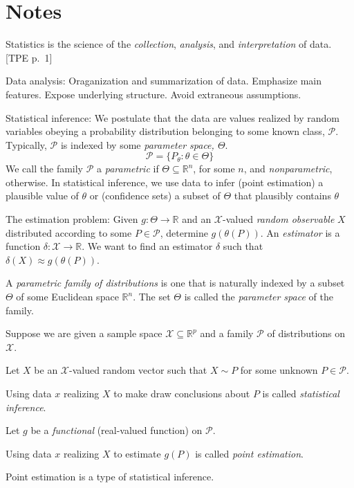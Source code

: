 \documentclass[12pt]{amsart}
\newcommand{\cP}{\mathscr{P}}
\newcommand{\cX}{\mathscr{X}}
\newcommand{\RR}{\mathbb{R}}
\begin{document}
\section{Notes}

Statistics is the science of the \emph{collection}, \emph{analysis}, and \emph{interpretation} of data. [TPE p.~1]

Data analysis: Oraganization and summarization of data.
Emphasize main features.
Expose underlying structure.
Avoid extraneous assumptions.

Statistical inference:
We postulate that the data are values realized by random variables obeying a probability distribution belonging to some known class, $\cP$.
Typically, $\cP$ is indexed by some \emph{parameter space, $\Theta$}.
\[
    \cP = \{P_\theta : \theta\in\Theta\}
\]
We call the family $\cP$ a \emph{parametric} if $\Theta\subseteq\RR^n$, for some $n$, and \emph{nonparametric}, otherwise.
In statistical inference, we use data to infer (point estimation) a plausible value of $\theta$ or (confidence sets) a subset of $\Theta$ that plausibly contains $\theta$

The estimation problem: Given $g:\Theta\to \RR$ and an $\cX$-valued \emph{random observable} $X$ distributed according to some $P\in\cP$, determine $g(\theta(P))$.
An \emph{estimator} is a function $\delta:\cX\to\RR$. We want to find an estimator $\delta$ such that $\delta(X)\approx g(\theta(P))$.

A \emph{parametric family of distributions} is one that is naturally indexed by a subset $\Theta$ of some Euclidean space $\RR^n$.
The set $\Theta$ is called the \emph{parameter space} of the family. 

Suppose we are given a sample space $\cX\subseteq\RR^p$ and a family $\cP$ of distributions on $\cX$.

Let $X$ be an $\cX$-valued random vector such that $X\sim P$ for some unknown $P\in\cP$.

Using data $x$ realizing $X$ to make draw conclusions about $P$ is called \emph{statistical inference}.

Let $g$ be a \emph{functional} (real-valued function) on $\cP$.

Using data $x$ realizing $X$ to estimate $g(P)$ is called \emph{point estimation}.

Point estimation is a type of statistical inference.
\end{document}
